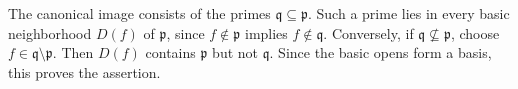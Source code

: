 The canonical image consists of the primes $\mathfrak q\subseteq\mathfrak p$. Such a prime lies in every basic neighborhood $D(f)$ of $\mathfrak p$, since $f\notin\mathfrak p$ implies $f\notin\mathfrak q$. Conversely, if $\mathfrak q\nsubseteq\mathfrak p$, choose $f\in\mathfrak q\setminus\mathfrak p$. Then $D(f)$ contains $\mathfrak p$ but not $\mathfrak q$. Since the basic opens form a basis, this proves the assertion.
